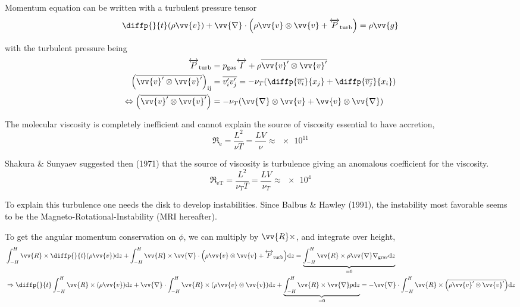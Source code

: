 \documentclass[10pt,a4paper,english]{article}
\let\originalleft\left
\let\originalright\right
\renewcommand{\left}{\mathopen{}\mathclose\bgroup\originalleft}
\renewcommand{\right}{\aftergroup\egroup\originalright}
\begin{document}
Momentum equation can be written with a turbulent pressure tensor
\begin{equation*}
    \diffp{}{t}(\rho \vv{v}) + \vv{\nabla}\cdot\left(\rho \vv{v} \otimes \vv{v} + \tens{P}_\mathrm{turb}\right) = \rho \vv{g}
\end{equation*}


with the turbulent pressure being
\begin{align*}
    \tens{P}_\mathrm{turb} &= p_\mathrm{gas} \tens{I} + \rho \overline{\vv{v}' \otimes \vv{v}'} \\
    \left(\overline{\vv{v}' \otimes \vv{v}'}\right)_\mathrm{ij} &= \overline{v_i' v_j'} =
    - \nu_T \left( \diffp{\overline{v_i}}{{x_j}} + \diffp{\overline{v_j}}{{x_i}} \right) \\
    \Leftrightarrow \left(\overline{\vv{v}' \otimes \vv{v}'}\right) &=
    - \nu_T \left(\vv{\nabla} \otimes \vv{v} + \vv{v} \otimes \vv{\nabla}\right)
\end{align*}


The molecular viscosity is completely inefficient and cannot explain the source
of viscosity essential to have accretion,
\begin{equation*}
    \mathfrak{R}_\mathrm{e} = \frac{L^2}{\nu T} = \frac{L V}{\nu} \approx \num{e11}
\end{equation*}

Shakura \& Sunyaev suggested then (1971) that the source of viscosity is
turbulence giving an anomalous coefficient for the viscosity.
\begin{equation*}
    \mathfrak{R}_\mathrm{eT} = \frac{L^2}{\nu_T T} = \frac{L V}{\nu_T} \approx \num{e4}
\end{equation*}


To explain this turbulence one needs the disk to develop instabilities. Since
Balbus \& Hawley (1991), the instability most favorable seems to be the
Magneto-Rotational-Instability (MRI hereafter).


To get the angular momentum conservation on $\phi$, we can multiply by $\vv{R}
\times$, and integrate over height,
\begin{align*}
    &\int_{-H}^H \vv{R} \times \diffp{}{t}(\rho \vv{v}) \d{z} +
    \int_{-H}^H \vv{R} \times \vv{\nabla} \cdot \left(\rho \vv{v} \otimes \vv{v} + \tens{P}_\mathrm{turb}\right) \d{z} =
    \underbrace{\int_{-H}^H \vv{R} \times \rho \vv{\nabla} \nabla_\mathrm{grav} \d{z}}_{= 0} \\
    &\Rightarrow \diffp{}{t} \int_{-H}^H \vv{R} \times (\rho \vv{v}) \d{z} +
    \vv{\nabla} \cdot \int_{-H}^H \vv{R} \times \left( \rho \vv{v} \otimes \vv{v} \right) \d{z} +
    \underbrace{\int_{-H}^H \vv{R} \times \vv{\nabla} p \d{z}}_{= 0} =
    - \vv{\nabla} \cdot \int_{-H}^H \vv{R} \times \left(\overline{\rho \vv{v}' \otimes \vv{v}'}\right) \d{z}
\end{align*}
\end{document}
